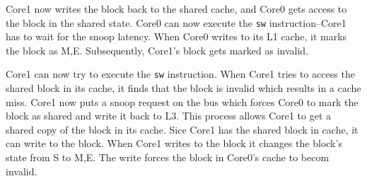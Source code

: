 \documentclass[12pt,a4]{article}
\begin{document}
\begin{enumerate}
    Core1 now writes the block back to the shared cache, and Core0 gets access to the block in the shared state.
    Core0 can now execute the \verb|sw| instruction--Core1 has to wait for the snoop latency.
    When Core0 writes to its L1 cache, it marks the block as M,E.
    Subsequently, Core1's block gets marked as invalid.
    
    Core1 can now try to execute the \verb|sw| instruction.
    When Core1 tries to access the shared block in its cache, it finds that the block is invalid which results in a cache miss.
    Core1 now puts a snoop request on the bus which forces Core0 to mark the block as shared and write it back to L3.
    This process allows Core1 to get a shared copy of the block in its cache.
    Sice Core1 has the shared block in cache, it can write to the block.
    When Core1 writes to the block it changes the block's state from S to M,E.
    The write forces the block in Core0's cache to becom invalid.

\end{enumerate}
\end{document}

